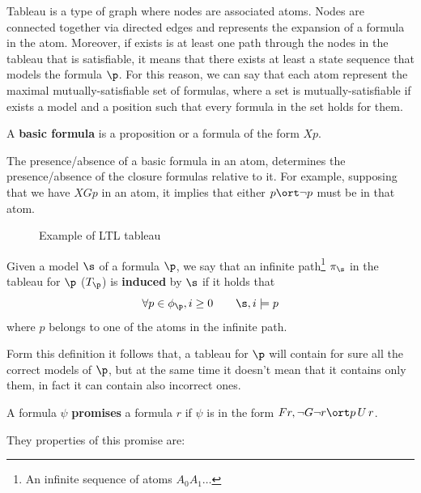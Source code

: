 \documentclass[oneside]{academica}
\begin{document}
Tableau is a type of graph where nodes are associated atoms.
Nodes are connected together via directed edges and represents the expansion of a formula in the atom.
Moreover, if exists is at least one path through the nodes in the tableau that is satisfiable, it means that there exists at least a state sequence that models the formula $\p$.
For this reason, we can say that each atom represent the maximal mutually-satisfiable set of formulas, where a set is mutually-satisfiable if exists a model and a position such that every formula in the set holds for them.

\begin{definition*}
  A \textbf{basic formula} is a proposition or a formula of the form $Xp$.
\end{definition*}

The presence/absence of a basic formula in an atom, determines the presence/absence of the closure formulas relative to it.
For example, supposing that we have $XGp$ in an atom, it implies that either $p \ort \neg p$ must be in that atom.
\begin{figure}[H]
  \centering
  
  \caption{Example of LTL tableau}
\end{figure}

\begin{definition*}
  Given a model $\s$ of a formula $\p$, we say that an infinite path\footnote{An infinite sequence of atoms $A_0 A_1 \ldots$} $\pi_\s$ in the tableau for $\p$ ($T_\p$) is \textbf{induced} by $\s$ if it holds that
  \begin{equation*}
    \forall p \in \phi_\p, i \ge 0 \qquad \s,i \models p
  \end{equation*}
  where $p$ belongs to one of the atoms in the infinite path.
\end{definition*}
Form this definition it follows that, a tableau for $\p$ will contain for sure all the correct models of $\p$, but at the same time it doesn't mean that it contains only them, in fact it can contain also incorrect ones.

\begin{definition*}[Promise]
  A formula $\psi$ \textbf{promises} a formula $r$ if $\psi$ is in the form $Fr, \neg G \neg r \ort p \,U\, r$.

  \bigskip
  They properties of this promise are:
\end{definition*}
\end{document}
